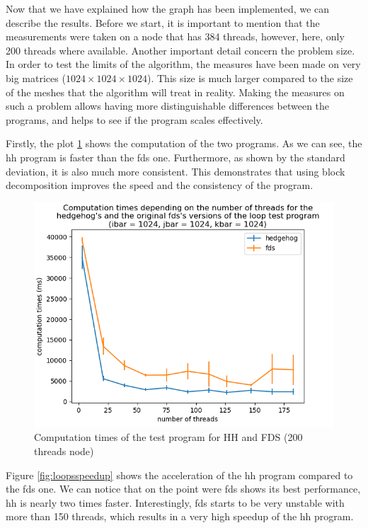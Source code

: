 Now that we have explained how the graph has been implemented, we can describe
the results. Before we start, it is important to mention that the measurements
were taken on a node that has 384 threads, however, here, only 200 threads where
available. Another important detail concern the problem size. In order to test
the limits of the algorithm, the measures have been made on very big matrices
($1024\times1024\times1024$). This size is much larger compared to the size of
the meshes that the algorithm will treat in reality. Making the measures on such
a problem allows having more distinguishable differences between the programs,
and helps to see if the program scales effectively.

Firstly, the plot \ref{fig:loopscomptime} shows the computation of the two
programs. As we can see, the \gls{hh} program is faster than the \gls{fds} one.
Furthermore, as shown by the standard deviation, it is also much more
consistent. This demonstrates that using block decomposition improves the speed
and the consistency of the program. \clearpage{}

\begin{figure}[ht!]
  \begin{center}
    \includegraphics[scale=0.6]{img/fds-loops/times.png}
    \caption{Computation times of the test program for HH and FDS (200 threads node)}
    \label{fig:loopscomptime}
  \end{center}
\end{figure}

Figure \ref{fig:loopsspeedup} shows the acceleration of the
\gls{hh} program compared to the \gls{fds} one. We can notice that on the point
were \gls{fds} shows its best performance, \gls{hh} is nearly two times faster.
Interestingly, \gls{fds} starts to be very unstable with more than 150 threads,
which results in a very high speedup of the \gls{hh} program.

